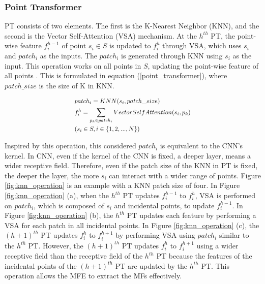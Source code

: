 \documentclass{article}
\begin{document}
\subsubsection{Point Transformer} \quad PT consists of two elements. The first is the K-Nearest Neighbor (KNN), and the second is the Vector Self-Attention (VSA) mechanism. At the $h^{th}$ PT, the point-wise feature $f_i^{h-1}$ of point $s_i\in S$ is updated to $f_i^{h}$ through VSA, which uses $s_i$ and $patch_i$ as the inputs. The $patch_i$ is generated through KNN using $s_i$ as the input. This operation works on all points in $S$, updating the point-wise feature of all points \cite{zhao2021point}. This is formulated in equation (\ref{point_transformer}), where $patch\_size$ is the size of K in KNN.
\begin{center}
\begin{equation}\label{point_transformer}
\scalebox{0.87}{$\begin{aligned}
    &patch_i = KNN(s_i,patch\_size) \\
    &f_i^h = \sum_{p_k\in patch_i}VectorSelfAttention(s_i,p_k) \\
    &(s_i \in S, i\in \left\{1,2,...,N\right\})
\end{aligned}$}
\end{equation}
\end{center}
\quad Inspired by this operation, this considered $patch_i$ is equivalent to the CNN's kernel. In CNN, even if the kernel of the CNN is fixed, a deeper layer, means a wider receptive field. Therefore, even if the patch size of the KNN in PT is fixed, the deeper the layer, the more $s_i$ can interact with a wider range of points. Figure \ref{fig:knn_operation} is an example with a KNN patch size of four. In Figure \ref{fig:knn_operation} (a), when the $h^{th}$ PT updates $f_i^{h-1}$ to $f_i^{h}$, VSA is performed on $patch_i$, which is composed of $s_i$ and incidental points, to update $f_i^{h-1}$. In Figure \ref{fig:knn_operation} (b), the $h^{th}$ PT updates each feature by performing a VSA for each patch in all incidental points. In Figure \ref{fig:knn_operation} (c), the $(h+1)^{th}$ PT updates $f_i^h$ to $f_i^{h+1}$ by performing VSA using $patch_i$ similar to the $h^{th}$ PT. However, the $(h+1)^{th}$ PT updates $f_i^h$ to $f_i^{h+1}$ using a wider receptive field than the receptive field of the $h^{th}$ PT because the features of the incidental points of the $(h+1)^{th}$ PT are updated by the $h^{th}$ PT. This operation allows the MFE to extract the MFs effectively.
\end{document}
